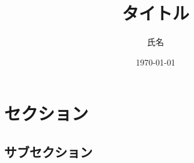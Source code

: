 \documentclass[a4j, 10pt]{jartivle}
\title{タイトル}
\author{氏名}
\date{\today}
\begin{document}
\maketitle

\section{セクション}
\subsection{サブセクション}
\end{document}
